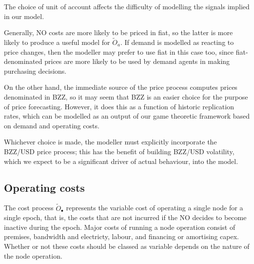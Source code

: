 \begin{remark}

  The choice of unit of account affects the difficulty of modelling the signals implied in our model.

  Generally, NO costs are more likely to be priced in fiat, so the latter is more likely to produce a useful model for $\tilde{O}_a$.
  If demand is modelled as reacting to price changes, then the modeller may prefer to use fiat in this case too, since fiat-denominated prices are more likely to be used by demand agents in making purchasing decisions.

  On the other hand, the immediate source of the price process computes prices denominated in BZZ, so it may seem that BZZ is an easier choice for the purpose of price forecasting.
  However, it does this as a function of historic replication rates, which can be modelled as an output of our game theoretic framework based on demand and operating costs.
  
  Whichever choice is made, the modeller must explicitly incorporate the BZZ/USD price process; this has the benefit of building BZZ/USD volatility, which we expect to be a significant driver of actual behaviour, into the model.

\end{remark}
  


\subsection{Operating costs}
\label{section:cost}

The cost process $\tilde{O}_\bullet$ represents the variable cost of operating a single node for a single epoch, that is, the costs that are not incurred if the NO decides to become inactive during the epoch.
%
Major costs of running a node operation consist of premises, bandwidth and electricty, labour, and financing or amortising capex.
%
Whether or not these costs should be classed as variable depends on the nature of the node operation.

